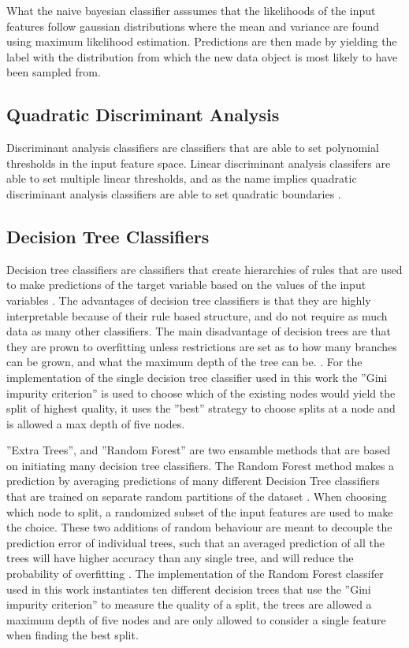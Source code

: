 What the naive bayesian classifier asssumes that the likelihoods of the input features follow gaussian distributions where the mean and variance are found using maximum likelihood estimation. Predictions are then made by yielding the label with the distribution from which the new data object is most likely to have been sampled from.

\subsection{Quadratic Discriminant Analysis}
Discriminant analysis classifiers are classifiers that are able to set polynomial thresholds in the input feature space. Linear discriminant analysis classifers are able to set multiple linear thresholds, and as the name implies quadratic discriminant analysis classifiers are able to set quadratic boundaries \cite{scikit_learn}.

\subsection{Decision Tree Classifiers} \label{meth:dt}

Decision tree classifiers are classifiers that create hierarchies of rules that are used to make predictions of the target variable based on the values of the input variables \cite{python_machine_learning_2nd}. The advantages of decision tree classifiers is that they are highly interpretable because of their rule based structure, and do not require as much data as many other classifiers. The main disadvantage of decision trees are that they are prown to overfitting unless restrictions are set as to how many branches can be grown, and what the maximum depth of the tree can be. \cite{python_machine_learning_2nd}. For the implementation of the single decision tree classifier used in this work the ''Gini impurity criterion'' is used to choose which of the existing nodes would yield the split of highest quality, it uses the ''best'' strategy to choose splits at a node and is allowed a max depth of five nodes. \bigskip

''Extra Trees'', and ''Random Forest'' are two ensamble methods that are based on initiating many decision tree classifiers. The Random Forest method makes a prediction by averaging predictions of many different Decision Tree classifiers that are trained on separate random partitions of the dataset \cite{gen_rand_for}. When choosing which node to split, a randomized subset of the input features are used to make the choice. These two additions of random behaviour are meant to decouple the prediction error of individual trees, such that an averaged prediction of all the trees will have higher accuracy than any single tree, and will reduce the probability of overfitting \cite{scikit_learn}. The implementation of the Random Forest classifer used in this work instantiates ten different decision trees that use the ''Gini impurity criterion'' to measure the quality of a split, the trees are allowed a maximum depth of five nodes and are only allowed to consider a single feature when finding the best split. \bigskip

